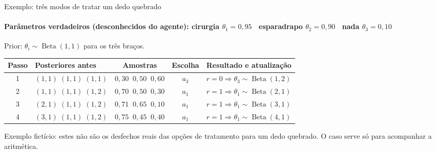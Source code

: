 \documentclass[aspectratio=169, 11pt]{beamer}
\newcommand{\Bdist}{\operatorname{Beta}}
\begin{document}
\begin{frame}{Exemplo: três modos de tratar um dedo quebrado}
  \framesubtitle{Parâmetros verdadeiros (desconhecidos do agente): cirurgia $\theta_1 = 0{,}95$ \textbullet\ esparadrapo $\theta_2 = 0{,}90$ \textbullet\ nada $\theta_3 = 0{,}10$}

  Prior: $\theta_i \sim \Bdist(1,1)$ para os três braços.

  \medskip
  \begin{center}\small
  \begin{tabular}{@{}clccl@{}}
    \toprule
    \textbf{Passo} & \textbf{Posteriores antes} & \textbf{Amostras} &
    \textbf{Escolha} & \textbf{Resultado e atualização} \\
    \midrule
    1 & $(1,1)\;(1,1)\;(1,1)$ & $0{,}30\;\;0{,}50\;\;0{,}60$ & $a_3$ & $r=0 \Rightarrow \theta_3 \sim \Bdist(1,2)$ \\
    2 & $(1,1)\;(1,1)\;(1,2)$ & $0{,}70\;\;0{,}50\;\;0{,}30$ & $a_1$ & $r=1 \Rightarrow \theta_1 \sim \Bdist(2,1)$ \\
    3 & $(2,1)\;(1,1)\;(1,2)$ & $0{,}71\;\;0{,}65\;\;0{,}10$ & $a_1$ & $r=1 \Rightarrow \theta_1 \sim \Bdist(3,1)$ \\
    4 & $(3,1)\;(1,1)\;(1,2)$ & $0{,}75\;\;0{,}45\;\;0{,}40$ & $a_1$ & $r=1 \Rightarrow \theta_1 \sim \Bdist(4,1)$ \\
    \bottomrule
  \end{tabular}
  \end{center}

  \medskip
  \begin{alertabox}
    Exemplo \alert{fictício}: estes não são os desfechos reais das opções
    de tratamento para um dedo quebrado. O caso serve só para acompanhar a
    aritmética.
  \end{alertabox}
\end{frame}
\end{document}
